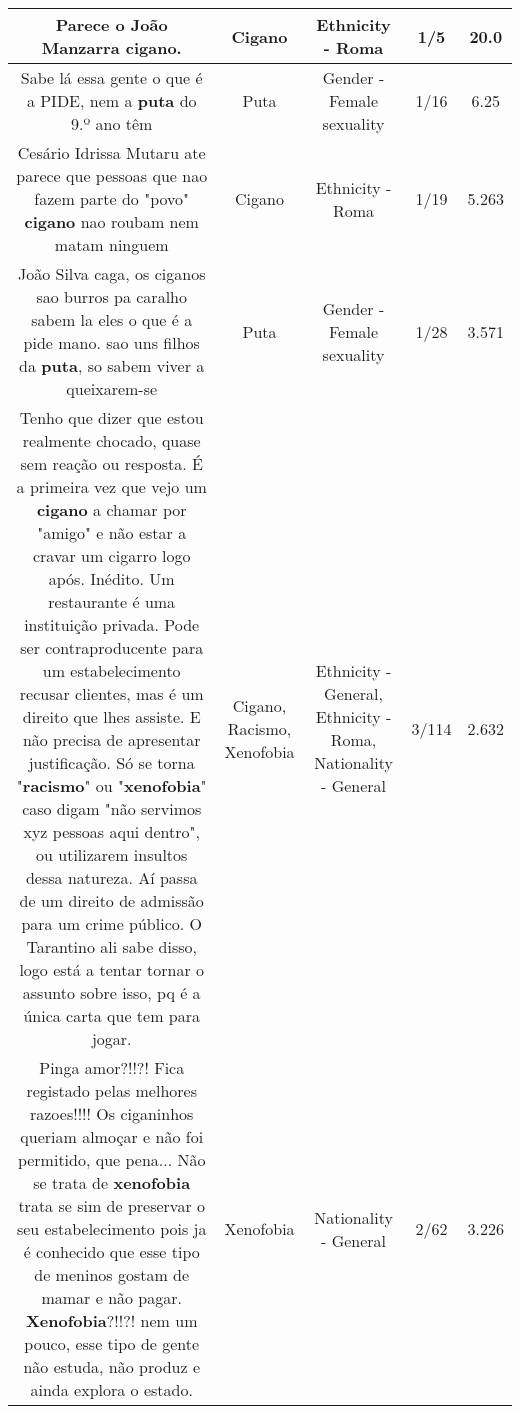 \documentclass[11pt]{article}
\newlength\mylength
\begin{document}
\begin{center}
\begin{longtable}{|C{.65\mylength}|C{.30\mylength}|C{.12\mylength}|C{.12\mylength}|C{.12\mylength}|}
  \small Parece o João Manzarra \textbf{cigano}.\normalsize   & Cigano & Ethnicity - Roma & 1/5 & 20.0 \\  \hline
  \small Sabe lá essa gente o que é a PIDE, nem a \textbf{puta} do 9.º ano têm\normalsize   & Puta & Gender - Female sexuality & 1/16 & 6.25 \\  \hline
  \small Cesário Idrissa Mutaru ate parece que pessoas que nao fazem parte do "povo" \textbf{cigano} nao roubam nem matam ninguem\normalsize   & Cigano & Ethnicity - Roma & 1/19 & 5.263 \\  \hline
  \small João Silva caga, os ciganos sao burros pa caralho sabem la eles o que é a pide mano. sao uns filhos da \textbf{puta}, so sabem viver a queixarem-se\normalsize   & Puta & Gender - Female sexuality & 1/28 & 3.571 \\  \hline
  \small Tenho que dizer que estou realmente chocado, quase sem reação ou resposta. É a primeira vez que vejo um \textbf{cigano} a chamar por "amigo" e não estar a cravar um cigarro logo após. Inédito. Um restaurante é uma instituição privada. Pode ser contraproducente para um estabelecimento recusar clientes, mas é um direito que lhes assiste. E não precisa de apresentar justificação. Só se torna "\textbf{racismo}" ou "\textbf{xenofobia}" caso digam "não servimos xyz pessoas aqui dentro", ou utilizarem insultos dessa natureza. Aí passa de um direito de admissão para um crime público. O Tarantino ali sabe disso, logo está a tentar tornar o assunto sobre isso, pq é a única carta que tem para jogar.\normalsize   & Cigano, Racismo, Xenofobia & Ethnicity - General, Ethnicity - Roma, Nationality - General & 3/114 & 2.632 \\  \hline
  \small Pinga amor?!!?! Fica registado pelas melhores razoes!!!! Os ciganinhos queriam almoçar e não foi permitido, que pena... Não se trata de \textbf{xenofobia} trata se sim de preservar o seu estabelecimento pois ja é conhecido que esse tipo de meninos gostam de mamar e não pagar. \textbf{Xenofobia}?!!?! nem um pouco, esse tipo de gente não estuda, não produz e ainda explora o estado.\normalsize   & Xenofobia & Nationality - General & 2/62 & 3.226 \\  \hline

\end{longtable}
\end{center}
\end{document}
